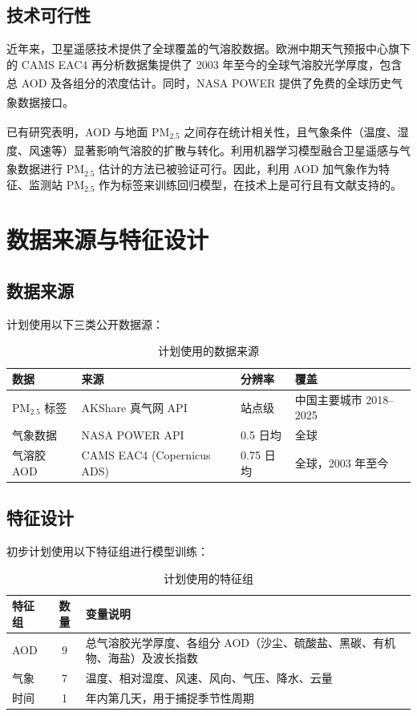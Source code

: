 \documentclass[UTF8,zihao=-4,a4paper]{ctexart}
\newcommand{\pmfine}{PM$_{2.5}$}
\newcommand{\aodd}{AOD}
\let\oldcite\cite
\renewcommand{\cite}[1]{\textsuperscript{\oldcite{#1}}}
\begin{document}
\subsection{技术可行性}

近年来，卫星遥感技术提供了全球覆盖的气溶胶数据。欧洲中期天气预报中心旗下的 CAMS EAC4 再分析数据集提供了 2003 年至今的全球气溶胶光学厚度，包含总 \aodd{} 及各组分的浓度估计\cite{cams}。同时，NASA POWER 提供了免费的全球历史气象数据接口\cite{nasa_power}。

已有研究表明，\aodd{} 与地面 \pmfine{} 之间存在统计相关性\cite{xin2016}，且气象条件（温度、湿度、风速等）显著影响气溶胶的扩散与转化\cite{zheng2017}。利用机器学习模型融合卫星遥感与气象数据进行 \pmfine{} 估计的方法已被验证可行\cite{wei2019}。因此，利用 \aodd{} 加气象作为特征、监测站 \pmfine{} 作为标签来训练回归模型，在技术上是可行且有文献支持的。

\section{数据来源与特征设计}

\subsection{数据来源}

计划使用以下三类公开数据源：

\begin{table}[H]
  \centering
  \caption{计划使用的数据来源}
  \small
  \begin{tabularx}{\textwidth}{lllX}
    \toprule
    数据 & 来源 & 分辨率 & 覆盖 \\
    \midrule
    \pmfine{} 标签 & AKShare 真气网 API & 站点级 & 中国主要城市 2018--2025 \\
    气象数据 & NASA POWER API & 0.5\textdegree{} 日均 & 全球 \\
    气溶胶 \aodd{} & CAMS EAC4 (Copernicus ADS) & 0.75\textdegree{} 日均 & 全球，2003 年至今 \\
    \bottomrule
  \end{tabularx}
\end{table}

\subsection{特征设计}

初步计划使用以下特征组进行模型训练：

\begin{table}[H]
  \centering
  \caption{计划使用的特征组}
  \begin{tabularx}{\textwidth}{lcX}
    \toprule
    特征组 & 数量 & 变量说明 \\
    \midrule
    \aodd{} & 9 & 总气溶胶光学厚度、各组分 \aodd{}（沙尘、硫酸盐、黑碳、有机物、海盐）及波长指数 \\
    气象 & 7 & 温度、相对湿度、风速、风向、气压、降水、云量 \\
    时间 & 1 & 年内第几天，用于捕捉季节性周期 \\
    \bottomrule
  \end{tabularx}
\end{table}
\end{document}
